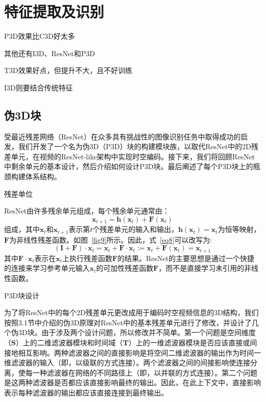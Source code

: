 \section{特征提取及识别}

P3D效果比C3D好太多

其他还有I3D、ResNet和P3D

T3D效果好点，但提升不大，且不好训练

I3D则要结合传统特征

\subsection{伪3D块}

受最近残差网络（ResNet）在众多具有挑战性的图像识别任务中取得成功的启发，我们开发了一个名为伪3D（P3D）块的构建模块族，以取代ResNet中的2D残差单元，在视频的ResNet-like架构中实现时空编码。接下来，我们将回顾ResNet中剩余单元的基本设计，然后介绍如何设计P3D块。最后阐述了每个P3D块上的瓶颈构建体系结构。

残差单位

ResNet由许多残余单元组成，每个残余单元通常由：
\begin{equation}
\label{eq8}
   \textbf{x}_{t+1}=\textbf{h}(\textbf{x}_{t})+\textbf{F}(\textbf{x}_{t})
\end{equation}
组成，其中$\textbf{x}_{t}$和$\textbf{x}_{t+1}$表示第$t$个残差单元的输入和输出，$\textbf{h}(\textbf{x}_{t})=\textbf{x}_{t}$为恒等映射，$\textbf{F}$为非线性残差函数。如图~\ref{fig9}所示。因此，式~\ref{eq8}可以改写为:
\begin{equation}
\label{eq9}
   (\textbf{I}+\textbf{F})\cdot \textbf{x}_{t}=\textbf{x}_{t}+\textbf{F}\cdot \textbf{x}_{t}:=\textbf{x}_{t}+\textbf{F}(\textbf{x}_{t})=\textbf{x}_{t+1}
\end{equation}
其中$\textbf{F}\cdot \textbf{x}_{t}$表示在$\textbf{x}_{t}$上执行残差函数$\textbf{F}$的结果。ResNet的主要思想是通过一个快捷的连接来学习参考单元输入$\textbf{x}_{t}$的可加性残差函数$\textbf{F}$，而不是直接学习未引用的非线性函数。

P3D块设计

为了将ResNet中的每个2D残差单元更改成用于编码时空视频信息的3D结构，我们按照3.1节中介绍的伪3D原理对ResNet中的基本残差单元进行了修改，并设计了几个伪3D块。由于涉及两个设计问题，所以修改并不简单。第一个问题是空间维度（$\textbf{S}$）上的二维滤波器模块和时间域（$\textbf{T}$）上的一维滤波器模块是否应该直接或间接地相互影响。两种滤波器之间的直接影响是将空间二维滤波器的输出作为时间一维滤波器的输入（即，以级联的方式连接）。两个滤波器之间的间接影响使连接分离，使每一种滤波器在网络的不同路径上（即，以并联的方式连接）。第二个问题是这两种滤波器是否都应该直接影响最终的输出。因此，在此上下文中，直接影响表示每种滤波器的输出都应该直接连接到最终输出。

